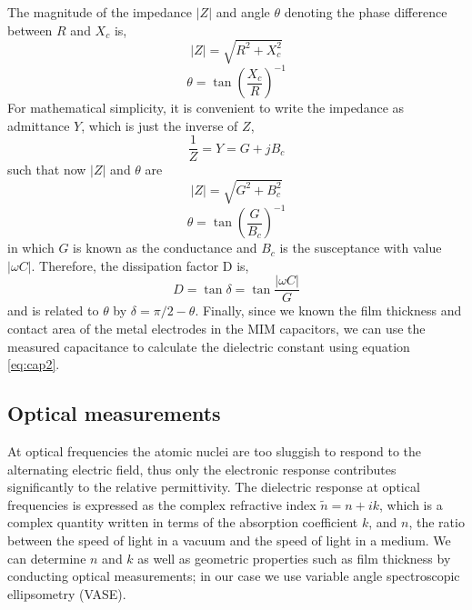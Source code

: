 The magnitude of the impedance $\vert Z\vert$ and angle $\theta$ denoting the phase difference between $R$ and $X_{c}$ is,    
\begin{equation}\label{eq:magZ}
\vert Z\vert = \sqrt{R^{2} + X_{c}^2}
\end{equation}
\begin{equation}\label{eq:thetaZ}
\theta = \tan{\left(\frac{X_{c}}{R}\right)}^{-1}
\end{equation}
For mathematical simplicity, it is convenient to write the impedance as admittance $Y$, which is just the inverse of $Z$,
\begin{equation}\label{eq:admit}
\frac{1}{Z} = Y = G + jB_{c}
\end{equation}
such that now $\vert Z \vert$ and $\theta$ are 
\begin{equation}\label{eq:magD}
\vert Z\vert = \sqrt{G^{2} + B_{c}^2}
\end{equation}
\begin{equation}\label{eq:thetaD}
\theta = \tan{\left(\frac{G}{B_{c}}\right)}^{-1}
\end{equation}
in which $G$ is known as the conductance and $B_{c}$ is the susceptance with value $\vert\omega C\vert$. Therefore, the dissipation factor D is, 
\begin{equation}\label{eq:tand}
D = \tan{\delta} =  \tan{\frac{\vert\omega C\vert}{G}}
\end{equation}
and is related to $\theta$ by $\delta = \pi/2 - \theta$. Finally, since we known the film thickness and contact area of the metal electrodes in the MIM capacitors, we can use the measured capacitance to calculate the dielectric constant using equation \ref{eq:cap2}.

\subsection{Optical measurements}

At optical frequencies the atomic nuclei are too sluggish to respond to the alternating electric field, thus only the electronic response contributes significantly to the relative permittivity. The dielectric response at optical frequencies is expressed as the complex refractive index $\tilde{n} = n + ik$, which is a complex quantity written in terms of the absorption coefficient $k$, and $n$, the ratio between the speed of light in a vacuum and the speed of light in a medium. We can determine $n$ and $k$ as well as geometric properties such as film thickness by conducting optical measurements; in our case we use variable angle spectroscopic ellipsometry (VASE). 

